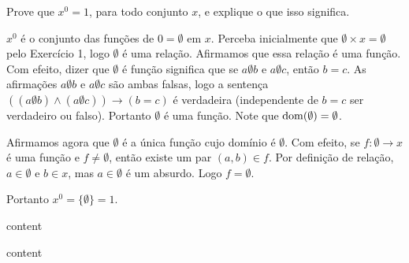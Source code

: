 \begin{exercicio}
	Prove que $x^0=1$, para todo conjunto $x$, e explique o que isso significa.
\end{exercicio}
\begin{solucao}
	$x^0$ é o conjunto das funções de $0=\emptyset$ em $x$. Perceba inicialmente que $\emptyset\times x=\emptyset$ pelo Exercício 1, logo $\emptyset$ é uma relação. Afirmamos que essa relação é uma função. Com efeito, dizer que $\emptyset$ é função significa que se $a\emptyset b$ e $a\emptyset c$, então $b=c$. As afirmações $a\emptyset b$ e $a\emptyset c$ são ambas falsas, logo a sentença $((a\emptyset b)\wedge(a\emptyset c))\to(b=c)$ é verdadeira (independente de $b=c$ ser verdadeiro ou falso). Portanto $\emptyset$ é uma função. Note que $\operatorname{dom}(\emptyset)=\emptyset$.
	
	Afirmamos agora que $\emptyset$ é a única função cujo domínio é $\emptyset$. Com efeito, se $f:\emptyset\to x$ é uma função e $f\neq\emptyset$, então existe um par $(a,b)\in f$. Por definição de relação, $a\in\emptyset$ e $b\in x$, mas $a\in\emptyset$ é um absurdo. Logo $f=\emptyset$.
	
	Portanto $x^0=\{\emptyset\}=1$.
\end{solucao}

\begin{exercicio}
	content
\end{exercicio}
\begin{solucao}
	content
\end{solucao}

